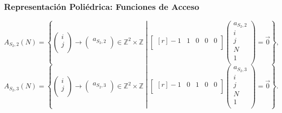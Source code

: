 \documentclass{beamer}\usetheme{Madrid} %
\begin{document}
\begin{frame}
\frametitle{Representación Poliédrica: Funciones de Acceso}
$$
{\scriptscriptstyle
 A_{S_2,2}(N) = 
        \left\{ 
            \left(\begin{matrix}i \\ j \\\end{matrix} \right) \to 
            \left(\begin{matrix} a_{S_2,2} \\\end{matrix} \right) 
            \in \mathbb{Z}^2 \times \mathbb{Z}  \middle|
            \begin{bmatrix*}[r] -1 & 1 & 0 & 0 & 0 \\ \end{bmatrix*} 
            \left( \begin{array}{c} a_{S_2,2} \\ i \\ j \\ N \\ 1\\ \end{array} \right)
            = \vec{0}
        \right\},
}
$$
$$
{\scriptscriptstyle
 A_{S_2,3}(N) = 
        \left\{ 
            \left(\begin{matrix}i \\ j \\\end{matrix} \right) \to 
            \left(\begin{matrix} a_{S_2,3} \\\end{matrix} \right) 
            \in \mathbb{Z}^2 \times \mathbb{Z}  \middle|
            \begin{bmatrix*}[r] -1 & 0 & 1 & 0 & 0 \\ \end{bmatrix*} 
            \left( \begin{array}{c} a_{S_2,3} \\ i \\ j \\ N \\ 1\\ \end{array} \right)
            = \vec{0}
        \right\}.
}
$$
\end{frame}
\end{document}
